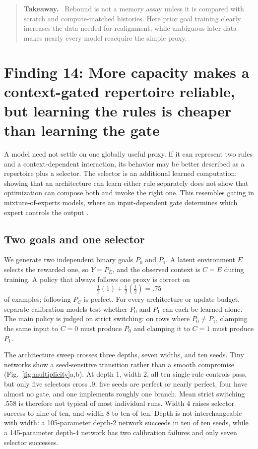 \documentclass[11pt,a4paper]{article}
\newcommand{\fig}[1]{Fig.~\ref{#1}}
\newenvironment{takeaway}{%
  \begin{quote}\small\color{ink}\noindent\textbf{Takeaway.}\ 
}{%
  \end{quote}
}
\begin{document}
\begin{takeaway}
Rebound is not a memory assay unless it is compared with scratch and compute-matched histories. Here prior goal training clearly increases the data needed for realignment, while ambiguous later data makes nearly every model reacquire the simple proxy.
\end{takeaway}

\section*{Finding 14: More capacity makes a context-gated repertoire reliable, but learning the rules is cheaper than learning the gate}

A model need not settle on one globally useful proxy. If it can represent two rules and a context-dependent interaction, its behavior may be better described as a repertoire plus a selector. The selector is an additional learned computation: showing that an architecture can learn either rule separately does not show that optimization can compose both and invoke the right one. This resembles gating in mixture-of-experts models, where an input-dependent gate determines which expert controls the output \citep{makkuva2020gated}.

\subsection*{Two goals and one selector}

We generate two independent binary goals $P_0$ and $P_1$. A latent environment $E$ selects the rewarded one, so $Y=P_E$, and the observed context is $C=E$ during training. A policy that always follows one proxy is correct on
\[
\tfrac12(1)+\tfrac12(\tfrac12)=.75
\]
of examples; following $P_C$ is perfect. For every architecture or update budget, separate calibration models test whether $P_0$ and $P_1$ can each be learned alone. The main policy is judged on strict switching: on rows where $P_0\ne P_1$, clamping the same input to $C=0$ must produce $P_0$ and clamping it to $C=1$ must produce $P_1$.

The architecture sweep crosses three depths, seven widths, and ten seeds. Tiny networks show a seed-sensitive transition rather than a smooth compromise (\fig{fig:multiplicity}a,b). At depth 1, width 2, all ten single-rule controls pass, but only five selectors cross .9; five seeds are perfect or nearly perfect, four have almost no gate, and one implements roughly one branch. Mean strict switching .558 is therefore not typical of most individual runs. Width 4 raises selector success to nine of ten, and width 8 to ten of ten. Depth is not interchangeable with width: a 105-parameter depth-2 network succeeds in ten of ten seeds, while a 145-parameter depth-4 network has two calibration failures and only seven selector successes.
\end{document}

